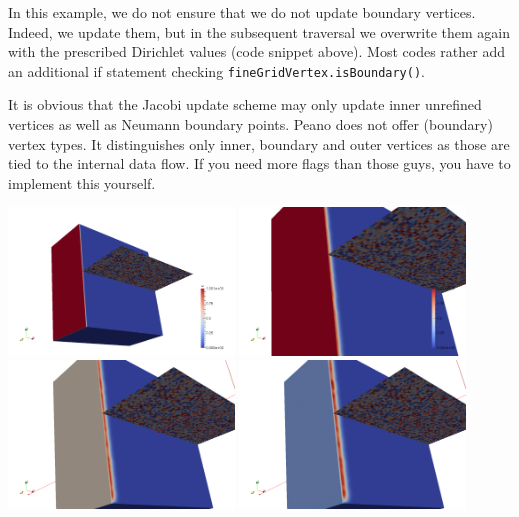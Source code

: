 \begin{remark}
In this example, we do not ensure that we do not update boundary vertices.
Indeed, we update them, but in the subsequent traversal we overwrite them again
with the prescribed Dirichlet values (code snippet above). Most codes rather add
an additional if statement checking \texttt{fineGridVertex.isBoundary()}.
\end{remark}


    \begin{remark}
    It is obvious that the Jacobi update scheme may only update inner
    unrefined vertices as well as Neumann boundary points. Peano does not offer
    (boundary) vertex types. It distinguishes only inner, boundary and outer
    vertices as those are tied to the internal data flow.
    If you need more flags than those guys, you have to implement this yourself.
    \end{remark}



\begin{center}
  \includegraphics[width=0.45\textwidth]{41_heat-equation/solution00.png}
  \includegraphics[width=0.45\textwidth]{41_heat-equation/solution01.png}
  \includegraphics[width=0.45\textwidth]{41_heat-equation/solution02.png}
  \includegraphics[width=0.45\textwidth]{41_heat-equation/solution03.png}
\end{center}


